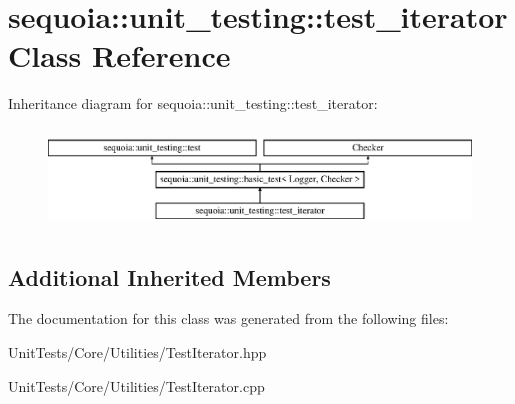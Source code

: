 \hypertarget{classsequoia_1_1unit__testing_1_1test__iterator}{}\section{sequoia\+::unit\+\_\+testing\+::test\+\_\+iterator Class Reference}
\label{classsequoia_1_1unit__testing_1_1test__iterator}
Inheritance diagram for sequoia\+::unit\+\_\+testing\+::test\+\_\+iterator\+:\begin{figure}[H]
\begin{center}
\leavevmode
\includegraphics[height=2.666667cm]{classsequoia_1_1unit__testing_1_1test__iterator}
\end{center}
\end{figure}
\subsection*{Additional Inherited Members}


The documentation for this class was generated from the following files\+:\begin{DoxyCompactItemize}
\item 
Unit\+Tests/\+Core/\+Utilities/Test\+Iterator.\+hpp\item 
Unit\+Tests/\+Core/\+Utilities/Test\+Iterator.\+cpp\end{DoxyCompactItemize}
